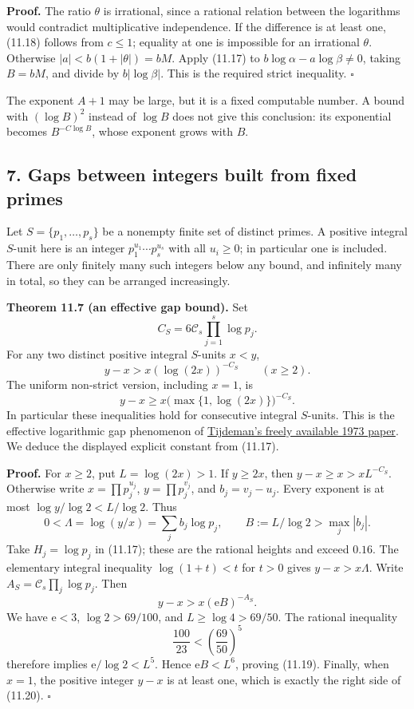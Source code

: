 \documentclass[
  11pt,
  a4paper,
]{article}
\newcounter{none} %
\begin{document}
\textbf{Proof.} The ratio \(\theta\) is irrational, since a rational
relation between the logarithms would contradict multiplicative
independence. If the difference is at least one, (11.18) follows from
\(c\le1\); equality at one is impossible for an irrational \(\theta\).
Otherwise \(|a|<b(1+|\theta|)=bM\). Apply (11.17) to
\(b\log\alpha-a\log\beta\ne0\), taking \(B=bM\), and divide by
\(b|\log\beta|\). This is the required strict inequality. \(\square\)

The exponent \(A+1\) may be large, but it is a fixed computable number.
A bound with \((\log B)^2\) instead of \(\log B\) does not give this
conclusion: its exponential becomes \(B^{-C\log B}\), whose exponent
grows with \(B\).

\subsection{7. Gaps between integers built from fixed
primes}\label{gaps-between-integers-built-from-fixed-primes}

Let \(S=\{p_1,\ldots,p_s\}\) be a nonempty finite set of distinct
primes. A positive integral \(S\)-unit here is an integer
\(p_1^{u_1}\cdots p_s^{u_s}\) with all \(u_i\ge0\); in particular one is
included. There are only finitely many such integers below any bound,
and infinitely many in total, so they can be arranged increasingly.

\textbf{Theorem 11.7 (an effective gap bound).} Set \[
C_S=6\mathcal C_s\prod_{j=1}^s\log p_j.
\] For any two distinct positive integral \(S\)-units \(x<y\), \[
y-x>x(\log(2x))^{-C_S}\qquad(x\ge2).
\tag{11.19}
\] The uniform non-strict version, including \(x=1\), is \[
y-x\ge x\bigl(\max\{1,\log(2x)\}\bigr)^{-C_S}.
\tag{11.20}
\] In particular these inequalities hold for consecutive integral
\(S\)-units. This is the effective logarithmic gap phenomenon of
\href{https://www.numdam.org/item/CM_1973__26_3_319_0/}{Tijdeman's
freely available 1973 paper}. We deduce the displayed explicit constant
from (11.17).

\textbf{Proof.} For \(x\ge2\), put \(L=\log(2x)>1\). If \(y\ge2x\), then
\(y-x\ge x>xL^{-C_S}\). Otherwise write \(x=\prod p_j^{u_j}\),
\(y=\prod p_j^{v_j}\), and \(b_j=v_j-u_j\). Every exponent is at most
\(\log y/\log2<L/\log2\). Thus \[
0<\Lambda=\log(y/x)=\sum_j b_j\log p_j,\qquad
B:=L/\log2>\max_j|b_j|.
\] Take \(H_j=\log p_j\) in (11.17); these are the rational heights and
exceed \(0.16\). The elementary integral inequality \(\log(1+t)<t\) for
\(t>0\) gives \(y-x>x\Lambda\). Write
\(A_S=\mathcal C_s\prod_j\log p_j\). Then \[
y-x>x(\mathrm e B)^{-A_S}.
\] We have \(\mathrm e<3\), \(\log2>69/100\), and \(L\ge\log4>69/50\).
The rational inequality \[
\frac{100}{23}<\left(\frac{69}{50}\right)^5
\] therefore implies \(\mathrm e/\log2<L^5\). Hence \(\mathrm e B<L^6\),
proving (11.19). Finally, when \(x=1\), the positive integer \(y-x\) is
at least one, which is exactly the right side of (11.20). \(\square\)
\end{document}
